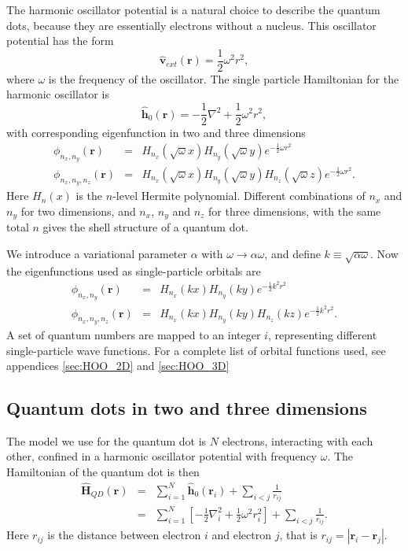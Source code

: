 		The harmonic oscillator potential is a natural choice to describe the quantum dots, because they are essentially electrons without a nucleus. This oscillator potential has the form
		\[
		\mathbf{\hat{v}}_{ext}\left(\mathbf{r}\right)=\frac{1}{2}\omega^{2}r^{2},
		\]
		where $\omega$ is the frequency of the oscillator.
		The single particle Hamiltonian for the harmonic oscillator is
		\[
		\mathbf{\hat{h}}_{0}\left(\mathbf{r}\right)=-\frac{1}{2}\nabla^{2}+\frac{1}{2}\omega^{2}r^{2},
		\]
		with corresponding eigenfunction in two and three dimensions
		\begin{eqnarray*}
		\phi_{n_{x},n_{y}}\left(\mathbf{r}\right) & = & H_{n_{x}}\left(\sqrt{\omega}x\right)H_{n_{y}}\left(\sqrt{\omega}y\right)e^{-\frac{1}{2}\omega r^{2}}\\
		\phi_{n_{x},n_{y},n_{z}}\left(\mathbf{r}\right) & = & H_{n_{x}}\left(\sqrt{\omega}x\right)H_{n_{y}}\left(\sqrt{\omega}y\right)H_{n_{z}}\left(\sqrt{\omega}z\right)e^{-\frac{1}{2}\omega r^{2}}.
		\end{eqnarray*}
		Here $H_{n}(x)$ is the $n$-level Hermite polynomial. Different combinations of $n_{x}$ and $n_{y}$ for two dimensions, and $n_{x}$, $n_{y}$ and $n_{z}$ for three dimensions, with the same total $n$ gives the shell structure of a quantum dot.

		We introduce a variational parameter $\alpha$ with $\omega \rightarrow \alpha \omega$, and define $k \equiv \sqrt{\alpha \omega}$. Now the eigenfunctions used as single-particle orbitals are 
		\begin{eqnarray*}
		\phi_{n_{x},n_{y}}\left(\mathbf{r}\right) & = & H_{n_{x}}\left(kx\right)H_{n_{y}}\left(ky\right)e^{-\frac{1}{2}k^{2}r^{2}}\\
		\phi_{n_{x},n_{y},n_{z}}\left(\mathbf{r}\right) & = & H_{n_{x}}\left(kx\right)H_{n_{y}}\left(ky\right)H_{n_{z}}\left(kz\right)e^{-\frac{1}{2}k^{2}r^{2}}.
		\end{eqnarray*}
		A set of quantum numbers are mapped to an integer $i$, representing different single-particle wave functions. For a complete list of orbital functions used, see appendices \ref{sec:HOO_2D} and \ref{sec:HOO_3D}

	\subsection{Quantum dots in two and three dimensions}

		The model we use for the quantum dot is $N$ electrons, interacting with each other, confined in a harmonic oscillator potential with frequency $\omega$. The Hamiltonian of the quantum dot is then
		\begin{eqnarray*}
			\hat{\mathbf{H}}_{QD}(\mathbf{r}) & = & \sum_{i=1}^{N}\hat{\mathbf{h}}_{0}\left(\mathbf{r}_{i}\right)+\sum_{i<j}\frac{1}{r_{ij}}\\
			 & = & \sum_{i=1}^{N}\left[-\frac{1}{2}\nabla_{i}^{2}+\frac{1}{2}\omega^{2}r_{i}^{2}\right]+\sum_{i<j}\frac{1}{r_{ij}}.
		\end{eqnarray*}
		Here $r_{ij}$ is the distance between electron $i$ and electron $j$, that is $r_{ij}=\left | \mathbf{r}_i - \mathbf{r}_j \right |$. 


